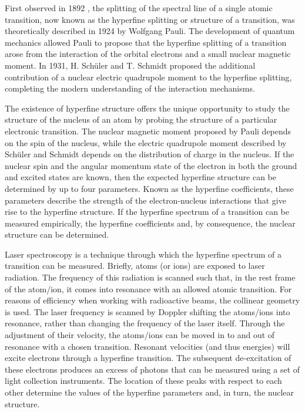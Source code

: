 \noindent First observed in 1892 \citep{michelson}, the splitting of the spectral line of a single atomic transition, now known as the hyperfine splitting or structure of a transition, was theoretically described in 1924 by Wolfgang Pauli\citep{Pauli1924}. The development of quantum mechanics allowed Pauli to propose that the hyperfine splitting of a transition arose from the interaction of the orbital electrons and a small nuclear magnetic moment. In 1931, H. Schüler and T. Schmidt proposed the additional contribution of a nuclear electric quadrupole moment to the hyperfine splitting, completing the modern understanding of the interaction mechanisms\citep{Lieb2001}.

The existence of hyperfine structure offers the unique opportunity to study the structure of the nucleus of an atom by probing the structure of a particular electronic transition. The nuclear magnetic moment proposed by Pauli depends on the spin of the nucleus, while the electric quadrupole moment described by Schüler and Schmidt depends on the distribution of charge in the nucleus. If the nuclear spin and the angular momentum state of the electron in both the ground and excited states are known, then the expected hyperfine structure can be determined by up to four parameters. Known as the hyperfine coefficients, these parameters describe the strength of the electron-nucleus interactions that give rise to the hyperfine structure. If the hyperfine spectrum of a transition can be measured empirically, the hyperfine coefficients and, by consequence, the nuclear structure can be determined. 

Laser spectroscopy is a technique through which the hyperfine spectrum of a transition can be measured. Briefly, atoms (or ions) are exposed to laser radiation. The frequency of this radiation is scanned such that, in the rest frame of the atom/ion, it comes into resonance with an allowed atomic transition. For reasons of efficiency when working with radioactive beams, the collinear geometry is used. The laser frequency is scanned by Doppler shifting the atoms/ions into resonance, rather than changing the frequency of the laser itself. Through the adjustment of their velocity, the atoms/ions can be moved in to and out of resonance with a chosen transition. Resonant velocities (and thus energies) will excite electrons through a hyperfine transition. The subsequent de-excitation of these electrons produces an excess of photons that can be measured using a set of light collection instruments. The location of these peaks with respect to each other determine the values of the hyperfine parameters and, in turn, the nuclear structure. 

